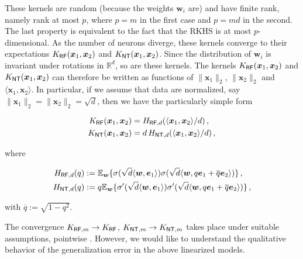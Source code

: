 These kernels are random (because the weights ${\boldsymbol w}_i$ are) and have finite rank, namely rank at most $p$, where $p=m$ in the first case and $p=md$ in the second. The last property is equivalent to the fact that the RKHS is at most $p$-dimensional. As the number of neurons diverge, these kernels converge to their expectations
$K_{{\sf RF}}({\boldsymbol x}_1,{\boldsymbol x}_2)$ and $K_{{\sf NT}}({\boldsymbol x}_1,{\boldsymbol x}_2)$. Since the distribution of ${\boldsymbol w}_i$ is invariant under rotations in ${\mathbb R}^d$, so are these kernels. The kernels  $K_{{\sf RF}}({\boldsymbol x}_1,{\boldsymbol x}_2)$ and $K_{{\sf NT}}({\boldsymbol x}_1,{\boldsymbol x}_2)$  can therefore be written as functions of $\|{\boldsymbol x}_1\|_2$, $\|{\boldsymbol x}_2\|_2$ and $\langle{\boldsymbol x}_1,{\boldsymbol x}_2\rangle$. In particular, if we assume that data are normalized, say $\|{\boldsymbol x}_1\|_2=\|{\boldsymbol x}_2\|_2=\sqrt{d}$,
then we have the particularly simple form

\begin{align}
  K_{{\sf RF}}({\boldsymbol x}_1,{\boldsymbol x}_2) & = H_{{\sf RF},d}(\langle{\boldsymbol x}_1,{\boldsymbol x}_2\rangle/d)\, , \label{eq:K_RF}\\
  K_{{\sf NT}}({\boldsymbol x}_1,{\boldsymbol x}_2) &= d\, H_{{\sf NT},d}(\langle{\boldsymbol x}_1,{\boldsymbol x}_2\rangle/d)\, ,\label{eq:K_NT}
\end{align}

where

\begin{align}
H_{{\sf RF},d}(q)& :=\mathbb{E}_{{\boldsymbol w}}\{\sigma(\sqrt{d}\langle{\boldsymbol w},{\boldsymbol e}_1\rangle) \sigma(\sqrt{d}\langle{\boldsymbol w},q{\boldsymbol e}_1+\overline{q}{\boldsymbol e}_2\rangle)\}\, ,\label{eq:HRF}\\
  H_{{\sf NT},d}(q)&:=q\mathbb{E}_{{\boldsymbol w}}\{\sigma'(\sqrt{d}\langle{\boldsymbol w},{\boldsymbol e}_1\rangle) \sigma'(\sqrt{d}\langle{\boldsymbol w},q{\boldsymbol e}_1+\overline{q}{\boldsymbol e}_2\rangle)\}\, ,
\end{align}

with $\overline{q}:=\sqrt{1-q^2}$.

The convergence  $K_{{\sf RF},m}\to K_{{\sf RF}}$, $K_{{\sf NT},m}\to K_{{\sf NT},m}$ takes place under suitable assumptions, pointwise  \cite{rahimi2007random}. However, we would like to understand the qualitative behavior of the generalization error in the above linearized models.

